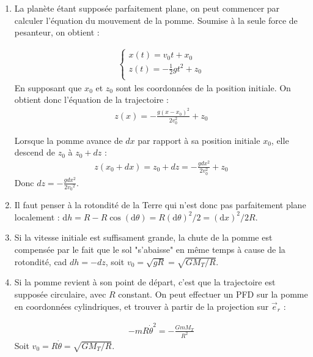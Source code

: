 \begin{correction}

\begin{enumerate}
\item La planète étant supposée parfaitement plane, on peut commencer par calculer l'équation du mouvement de la pomme. Soumise à la seule force de pesanteur, on obtient :

\begin{align*}
	\left\lbrace
\begin{array}{ccc}
 x(t) =  v_0t+x_0 \\
 z(t) = -\frac{1}{2}gt^2+z_0 \\
\end{array}\right.
\end{align*}
En supposant que $x_0$ et $z_0$ sont les coordonnées de la position initiale. On obtient donc l'équation de la trajectoire :
\begin{align*}
	z(x) = -\frac{g(x-x_0)^2}{2v_0^2}+z_0
\end{align*}

Lorsque la pomme avance de $dx$ par rapport à sa position initiale $x_0$, elle descend de $z_0$ à $z_0+dz$ :
\begin{align*}
	z(x_0+dx)=z_0+dz=-\frac{gdx^2}{2v_0^2}+z_0
\end{align*}
Donc $dz=-\frac{gdx^2}{2{v_0}^2}$.

\item Il faut penser à la rotondité de la Terre qui n'est donc pas parfaitement plane localement : d$h=R-R\cos(\mathrm{d}\theta)=R(\mathrm{d}\theta)^2/2=(\mathrm{d}x)^2/2R$.

\item Si la vitesse initiale est suffisament grande, la chute de la pomme est compensée par le fait que le sol "s'abaisse" en même temps à cause de la rotondité, cad $dh=-dz$, soit $v_0=\sqrt{gR}=\sqrt{GM_T/R}$.

\item Si la pomme revient à son point de départ, c'est que la trajectoire est supposée circulaire, avec $R$ constant. On peut effectuer un PFD sur la pomme en coordonnées cylindriques, et trouver à partir de la projection sur $\vec{e}_r$ :

\begin{align*}
 -mR\dot{\theta}^2 =  -\frac{GmM_T}{R^2} 
\end{align*}
Soit $v_0=R\dot{\theta}=\sqrt{GM_T/R}$.
\end{enumerate}

\end{correction}

